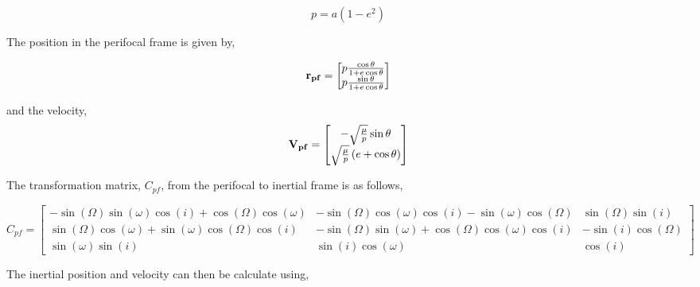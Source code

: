     \begin{equation}
        p = a \left(1 - e^2\right)
    \end{equation}

    The position in the perifocal frame is given by,

    \begin{equation}
        \mathbf{r_{pf}}=\begin{bmatrix}
            p \frac{\cos{\theta}}{1 + e \cos{\theta}} \\
            p \frac{\sin{\theta}}{1 + e \cos{\theta}} \\
        \end{bmatrix}
    \end{equation}

    and the velocity,
    \begin{equation}
        \mathbf{V_{pf}}=\begin{bmatrix}
            -\sqrt{\frac{\mu}{p}} \sin{\theta} \\
            \sqrt{\frac{\mu}{p}} \left(e + \cos{\theta}\right)
        \end{bmatrix}
    \end{equation}

    The transformation matrix, $C_{pf}$, from the perifocal to inertial frame is as follows,

    \begin{equation}
        C_{pf} = \left[\begin{matrix}- \sin{\left(\Omega \right)} \sin{\left(\omega \right)} \cos{\left(i \right)} + \cos{\left(\Omega \right)} \cos{\left(\omega \right)} & - \sin{\left(\Omega \right)} \cos{\left(\omega \right)} \cos{\left(i \right)} - \sin{\left(\omega \right)} \cos{\left(\Omega \right)} & \sin{\left(\Omega \right)} \sin{\left(i \right)}\\\sin{\left(\Omega \right)} \cos{\left(\omega \right)} + \sin{\left(\omega \right)} \cos{\left(\Omega \right)} \cos{\left(i \right)} & - \sin{\left(\Omega \right)} \sin{\left(\omega \right)} + \cos{\left(\Omega \right)} \cos{\left(\omega \right)} \cos{\left(i \right)} & - \sin{\left(i \right)} \cos{\left(\Omega \right)}\\\sin{\left(\omega \right)} \sin{\left(i \right)} & \sin{\left(i \right)} \cos{\left(\omega \right)} & \cos{\left(i \right)}\end{matrix}\right]
    \end{equation}

    The inertial position and velocity can then be calculate using,


